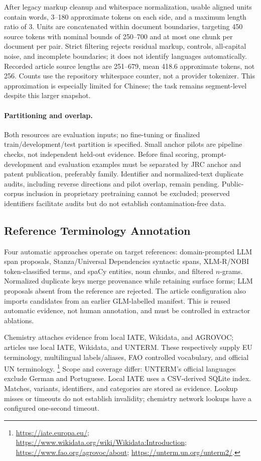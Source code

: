 After legacy markup cleanup and whitespace normalization, usable aligned units contain words,
3--180 approximate tokens on each side, and a maximum length ratio of 3. Units are concatenated
within document boundaries, targeting 450 source tokens with nominal bounds of 250--700 and at most
one chunk per document per pair. Strict filtering rejects residual markup, controls, all-capital
noise, and incomplete boundaries; it does not identify languages automatically. Recorded article
source lengths are 251--679, mean 418.6 approximate tokens, not 256. Counts use the repository
whitespace counter, not a provider tokenizer. This approximation is especially limited for Chinese;
the task remains segment-level despite this larger snapshot.

\paragraph{Partitioning and overlap.}
Both resources are evaluation inputs; no fine-tuning or finalized train/development/test partition
is specified. Small anchor pilots are pipeline checks, not independent held-out evidence. Before
final scoring, prompt-development and evaluation examples must be separated by JRC anchor and patent
publication, preferably family. Identifier and normalized-text duplicate audits, including reverse
directions and pilot overlap, remain pending. Public-corpus inclusion in proprietary pretraining
cannot be excluded; preserved identifiers facilitate audits but do not establish contamination-free data.

\subsection{Reference Terminology Annotation}
\label{sec:terminology}

Four automatic approaches operate on target references: domain-prompted LLM span proposals,
Stanza/Universal Dependencies syntactic spans, XLM-R/NOBI token-classified terms, and spaCy entities,
noun chunks, and filtered $n$-grams. Normalized duplicate keys merge provenance while retaining
surface forms; LLM proposals absent from the reference are rejected. The article configuration also
imports candidates from an earlier GLM-labelled manifest. This is reused automatic evidence, not
human annotation, and must be controlled in extractor ablations.

Chemistry attaches evidence from local IATE, Wikidata, and AGROVOC; articles use local IATE,
Wikidata, and UNTERM. These respectively supply EU terminology, multilingual labels/aliases,
FAO controlled vocabulary, and official UN terminology.
\footnote{\url{https://iate.europa.eu/};
\url{https://www.wikidata.org/wiki/Wikidata:Introduction};
\url{https://www.fao.org/agrovoc/about}; \url{https://unterm.un.org/unterm2/}.}
Scope and coverage differ: UNTERM's official languages exclude German and Portuguese. Local IATE
uses a CSV-derived SQLite index. Matches, variants, identifiers, and categories are stored as
evidence. Lookup misses or timeouts do not establish invalidity; chemistry network lookups have
a configured one-second timeout.

